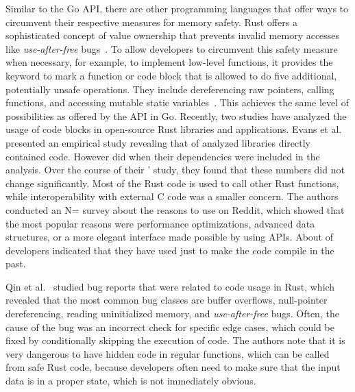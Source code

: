 Similar to the Go \unsafe{} \acrshort{API}, there are other programming languages that offer ways to circumvent their
respective measures for memory safety.
Rust offers a sophisticated concept of value ownership that prevents invalid memory accesses like
\textit{use-after-free} bugs~\cite{matsakis2014}.
To allow developers to circumvent this safety measure when necessary, for example, to implement low-level functions, it
provides the \unsafe{} keyword to mark a function or code block that is allowed to do five additional, potentially
unsafe operations.
They include dereferencing raw pointers, calling \unsafe{} functions, and accessing mutable static
variables~\cite{matsakis2014}.
This achieves the same level of possibilities as offered by the \unsafe{} \acrshort{API} in Go.
Recently, two studies have analyzed the usage of \unsafe{} code blocks in open-source Rust libraries and applications.
Evans et al.~\cite{evans2020} presented an empirical study revealing that  of analyzed
libraries directly contained \unsafe{} code.
However  did when their dependencies were included in the analysis.
Over the course of their ' study, they found that these numbers did not change significantly.
Most of the \unsafe{} Rust code is used to call other Rust functions, while interoperability with external C code was a
smaller concern.
The authors conducted an N= survey about the reasons to use \unsafe{} on Reddit, which showed that the most
popular reasons were performance optimizations, advanced data structures, or a more elegant interface made possible by
using \unsafe{} \acrshort{API}s.
About  of developers indicated that they have used \unsafe{} just to make the code compile in the past.

Qin et al.~\cite{qin2020} studied bug reports that were related to \unsafe{} code usage in Rust, which revealed that the
most common bug classes are buffer overflows, null-pointer dereferencing, reading uninitialized memory, and
\textit{use-after-free} bugs.
Often, the cause of the bug was an incorrect check for specific edge cases, which could be fixed by conditionally
skipping the execution of \unsafe{} code.
The authors note that it is very dangerous to have hidden \unsafe{} code in regular functions, which can be called from
safe Rust code, because developers often need to make sure that the input data is in a proper state, which is not
immediately obvious.


